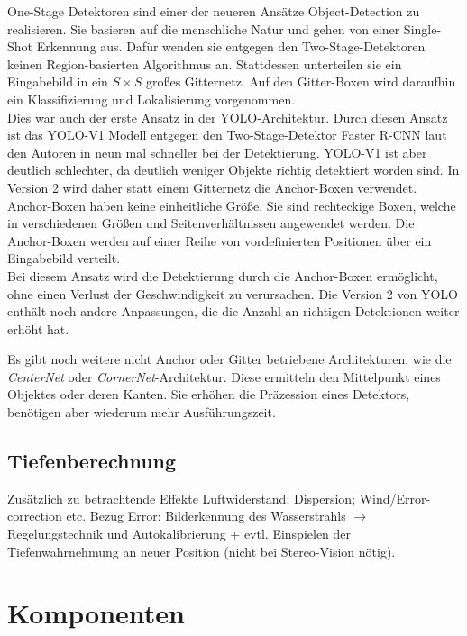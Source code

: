 One-Stage Detektoren sind einer der neueren Ansätze Object-Detection zu realisieren.
Sie basieren auf die menschliche Natur und gehen von einer Single-Shot Erkennung aus. Dafür wenden sie entgegen den Two-Stage-Detektoren keinen Region-basierten Algorithmus an.
Stattdessen unterteilen sie ein Eingabebild in ein $S \times  S$ großes Gitternetz. Auf den Gitter-Boxen wird daraufhin ein Klassifizierung und Lokalisierung vorgenommen.\\
Dies war auch der erste Ansatz in der \ac{YOLO}-Architektur. Durch diesen Ansatz ist das \ac{YOLO}-V1 Modell entgegen den Two-Stage-Detektor Faster \ac{R-CNN} laut den Autoren in \cite{YOLO_V3} neun mal schneller bei der Detektierung. \ac{YOLO}-V1 ist aber deutlich schlechter, da deutlich weniger Objekte richtig detektiert worden sind. In Version 2 wird daher statt einem Gitternetz die Anchor-Boxen verwendet. Anchor-Boxen haben keine einheitliche Größe. Sie sind rechteckige Boxen, welche in verschiedenen Größen und Seitenverhältnissen angewendet werden. Die Anchor-Boxen werden auf einer Reihe von vordefinierten Positionen über ein Eingabebild verteilt.\\
Bei diesem Ansatz wird die Detektierung durch die Anchor-Boxen ermöglicht, ohne einen Verlust der Geschwindigkeit zu verursachen. Die Version 2 von \ac{YOLO} enthält noch andere Anpassungen, die die Anzahl an richtigen Detektionen weiter erhöht hat.
\cite{YOLO_V3}

Es gibt noch weitere nicht Anchor oder Gitter betriebene Architekturen, wie die \textit{CenterNet} oder \textit{CornerNet}-Architektur. Diese ermitteln den Mittelpunkt eines Objektes oder deren Kanten. Sie erhöhen die Präzession eines Detektors, benötigen aber wiederum mehr Ausführungszeit.\cite{yolo_all}

\subsection{Tiefenberechnung}

Zusätzlich zu betrachtende Effekte Luftwiderstand; Dispersion; Wind/Error-correction etc.
Bezug Error: Bilderkennung des Wasserstrahls $\rightarrow$ Regelungstechnik und Autokalibrierung
+ evtl. Einspielen der Tiefenwahrnehmung an neuer Position (nicht bei Stereo-Vision nötig).

\section{Komponenten}

